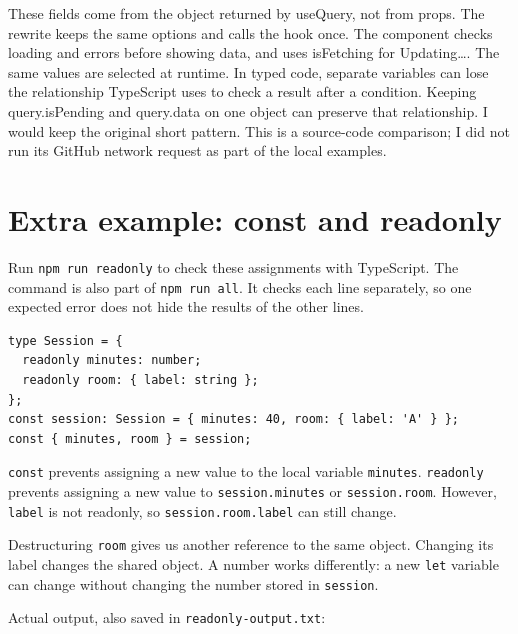 \documentclass[
  10pt,
  a4paper,
]{article}
\begin{document}
These fields come from the object returned by useQuery, not from props.
The rewrite keeps the same options and calls the hook once. The
component checks loading and errors before showing data, and uses
isFetching for Updating\ldots. The same values are selected at runtime.
In typed code, separate variables can lose the relationship TypeScript
uses to check a result after a condition. Keeping query.isPending and
query.data on one object can preserve that relationship. I would keep
the original short pattern. This is a source-code comparison; I did not
run its GitHub network request as part of the local examples.

\section{Extra example: const and
readonly}\label{extra-example-const-and-readonly}

Run \texttt{npm run readonly} to check these assignments with
TypeScript. The command is also part of \texttt{npm run all}. It checks
each line separately, so one expected error does not hide the results of
the other lines.

\begin{minipage}{\linewidth}

\begin{lstlisting}
type Session = {
  readonly minutes: number;
  readonly room: { label: string };
};
const session: Session = { minutes: 40, room: { label: 'A' } };
const { minutes, room } = session;
\end{lstlisting}

\end{minipage}\par

\texttt{const} prevents assigning a new value to the local variable
\texttt{minutes}. \texttt{readonly} prevents assigning a new value to
\texttt{session.\allowbreak{}minutes} or
\texttt{session.\allowbreak{}room}. However, \texttt{label} is not
readonly, so \texttt{session.\allowbreak{}room.\allowbreak{}label} can
still change.

Destructuring \texttt{room} gives us another reference to the same
object. Changing its label changes the shared object. A number works
differently: a new \texttt{let} variable can change without changing the
number stored in \texttt{session}.

Actual output, also saved in \texttt{readonly-output.\allowbreak{}txt}:
\end{document}
